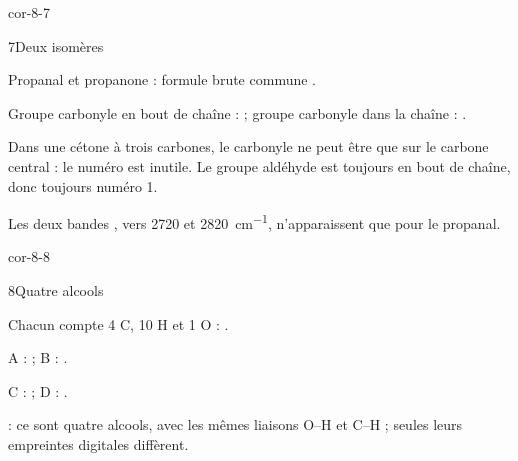 \begin{blocLivre}{cor-8-7}
\begin{corrige}{7}{Deux isomères}
\begin{questions}
\item Propanal  et propanone  : formule brute commune .
\item Groupe carbonyle en bout de chaîne :  ; groupe carbonyle dans la chaîne : .
\item Dans une cétone à trois carbones, le carbonyle ne peut être que sur le carbone central : le numéro est inutile. Le groupe
aldéhyde est toujours en bout de chaîne, donc toujours numéro 1.
\item Les deux bandes , vers 2720 et \qty{2820}{cm^{-1}}, n'apparaissent que pour le propanal.
\end{questions}
\end{corrige}
\end{blocLivre}
\begin{blocLivre}{cor-8-8}
\begin{corrige}{8}{Quatre alcools}
\begin{questions}
\item Chacun compte 4 C, 10 H et 1 O : .
\item A :  ; B : .
\item C :  ; D : .
\item {} : ce sont quatre alcools, avec les mêmes liaisons O--H et C--H ; seules leurs empreintes digitales diffèrent.
\end{questions}
\end{corrige}
\end{blocLivre}
